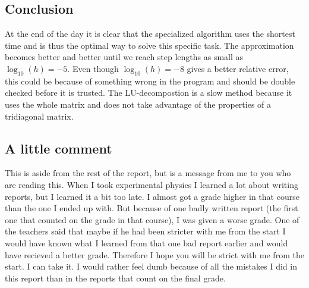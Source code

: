 \documentclass[12pt,a4paper]{article}
\begin{document}
\subsection*{Conclusion}
At the end of the day it is clear that the specialized algorithm uses the shortest time and is thus the optimal way to solve this specific task. The approximation becomes better and better until we reach step lengths as small as $\log_{10}(h) = -5$. Even though $\log_{10}(h) = -8$ gives a better relative error, this could be because of something wrong in the program and should be double checked before it is trusted. The LU-decompostion is a slow method because it uses the whole matrix and does not take advantage of the properties of a tridiagonal matrix.
\subsection*{A little comment}
This is aside from the rest of the report, but is a message from me to you who are reading this. When I took experimental physics I learned a lot about writing reports, but I learned it a bit too late. I almost got a grade higher in that course than the one I ended up with. But because of one badly written report (the first one that counted on the grade in that course), I was given a worse grade. One of the teachers said that maybe if he had been stricter with me from the start I would have known what I learned from that one bad report earlier and would have recieved a better grade. Therefore I hope you will be strict with me from the start. I can take it. I would rather feel dumb because of all the mistakes I did in this report than in the reports that count on the final grade.
 
\end{document}
